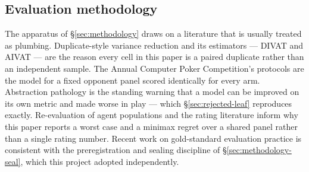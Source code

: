 \subsection{Evaluation methodology}
\label{sec:related-eval}

The apparatus of \S\ref{sec:methodology} draws on a literature that is usually treated as
plumbing. Duplicate-style variance reduction and its estimators --- DIVAT \cite{zinkevich-divat} and
AIVAT \cite{burch-aivat} --- are the reason every cell in this paper is a paired duplicate rather
than an independent sample. The Annual Computer Poker Competition's protocols \cite{acpc} are the
model for a fixed opponent panel scored identically for every arm. Abstraction pathology
\cite{waugh-abstraction} is the standing warning that a model can be improved on its own metric and
made worse in play --- which \S\ref{sec:rejected-leaf} reproduces exactly. Re-evaluation of agent
populations \cite{balduzzi-reeval} and the rating literature
\cite{coulom-whr,herbrich-trueskill,nelo} inform why this paper reports a worst case and a minimax
regret over a shared panel rather than a single rating number. Recent work on gold-standard
evaluation practice \cite{kelidari2026goldstandard} is consistent with the preregistration and
sealing discipline of \S\ref{sec:methodology-seal}, which this project adopted independently.
